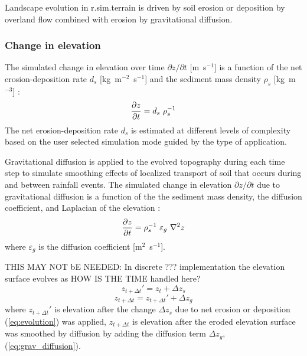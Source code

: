 \documentclass[gmd, manuscript]{copernicus}
\begin{document}
Landscape evolution in r.sim.terrain 
is driven by soil erosion or deposition by overland flow combined with erosion by gravitational diffusion.

\subsubsection{Change in elevation} 

The simulated change in elevation over time 
${\partial z / \partial t}$ [\unit{m~s}$^{-1}$] is a function of
the net erosion-deposition rate $d_s$ [\unit{kg~m}$^{-2}$~\unit{s}$^{-1}$] 
and the sediment mass density $\rho_s$ [\unit{kg~m}$^{-3}$] 
\citep{Mitasova2013}:
\begin{equation}
\label{eq:evolution} 
{\partial z \over \partial t } = d_s ~ \rho_s^{-1} 
\end{equation}
The net erosion-deposition rate $d_s$ is estimated at different levels of complexity based 
on the user selected simulation mode guided by the type of application.

\noindent
Gravitational diffusion is applied to the evolved topography during each time step
to simulate smoothing effects of localized transport of soil that
occurs during and between rainfall events.
The simulated change in elevation $\partial z / \partial t$
due to gravitational diffusion
is a function of the the sediment mass density,
the diffusion coefficient, and Laplacian of the elevation
\citep{thaxton2004}:
\begin{equation}
\label{eq:grav_diffusion} 
{\partial z \over \partial t } = \rho_s^{-1} ~ \varepsilon_g ~ \nabla^2 z 
\end{equation}
\noindent
where $\varepsilon_g$ is the diffusion coefficient [\unit{m}$^{2}$~\unit{s}$^{-1}$].

THIS MAY NOT bE NEEDED: In discrete ??? implementation the elevation surface evolves as
HOW IS THE TIME handled here?
\begin{equation}
\label{eq:evolution_disc1} 
z_{t+\Delta t}' = z_t + \Delta z_s  
\end{equation}
\begin{equation}
\label{eq:evolution_disc2} 
z_{t+\Delta t} = z_{t+\Delta t}' + \Delta z_g 
\end{equation}
where $z_{t+\Delta t}'$ is elevation after the change $\Delta z_s$ due to net erosion or deposition (\ref{eq:evolution})
was applied, $z_{t+\Delta t}$ is elevation after the eroded elevation surface
was smoothed by diffusion by adding the diffusion term $\Delta z_g$, (\ref{eq:grav_diffusion}).  
\end{document}

